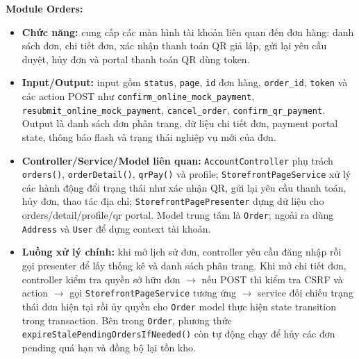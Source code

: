 \documentclass[a4paper]{article}
\begin{document}
\textbf{Module Orders:}
\begin{itemize}
    \item \textbf{Chức năng:} cung cấp các màn hình tài khoản liên quan đến đơn hàng: danh sách đơn, chi tiết đơn, xác nhận thanh toán QR giả lập, gửi lại yêu cầu duyệt, hủy đơn và portal thanh toán QR dùng token.
    \item \textbf{Input/Output:} input gồm \texttt{status}, \texttt{page}, \texttt{id} đơn hàng, \texttt{order\_id}, \texttt{token} và các action POST như \texttt{confirm\_online\_mock\_payment}, \texttt{resubmit\_online\_mock\_payment}, \texttt{cancel\_order}, \texttt{confirm\_qr\_payment}. Output là danh sách đơn phân trang, dữ liệu chi tiết đơn, payment portal state, thông báo flash và trạng thái nghiệp vụ mới của đơn.
    \item \textbf{Controller/Service/Model liên quan:} \texttt{AccountController} phụ trách \texttt{orders()}, \texttt{orderDetail()}, \texttt{qrPay()} và profile; \texttt{StorefrontPageService} xử lý các hành động đổi trạng thái như xác nhận QR, gửi lại yêu cầu thanh toán, hủy đơn, thao tác địa chỉ; \texttt{StorefrontPagePresenter} dựng dữ liệu cho orders/detail/profile/qr portal. Model trung tâm là \texttt{Order}; ngoài ra dùng \texttt{Address} và \texttt{User} để dựng context tài khoản.
    \item \textbf{Luồng xử lý chính:} khi mở lịch sử đơn, controller yêu cầu đăng nhập rồi gọi presenter để lấy thống kê và danh sách phân trang. Khi mở chi tiết đơn, controller kiểm tra quyền sở hữu đơn $\to$ nếu POST thì kiểm tra CSRF và action $\to$ gọi \texttt{StorefrontPageService} tương ứng $\to$ service đối chiếu trạng thái đơn hiện tại rồi ủy quyền cho \texttt{Order} model thực hiện state transition trong transaction. Bên trong \texttt{Order}, phương thức \texttt{expireStalePendingOrdersIfNeeded()} còn tự động chạy để hủy các đơn pending quá hạn và đồng bộ lại tồn kho.
\end{itemize}
\end{document}
